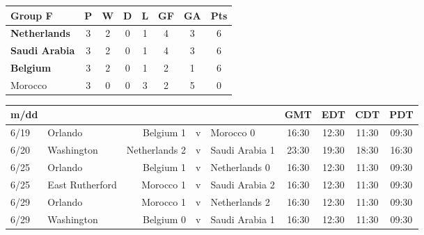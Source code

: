 \begin{figure}[H]

\begin{tabular}{l*{7}{c}}
Group F & P & W & D & L & GF & GA & Pts \\ \hline
\textbf{Netherlands} & 3 & 2 & 0 & 1 & 4 & 3 & 6 \\
\textbf{Saudi Arabia} &  3 & 2 & 0 & 1 & 4 & 3 & 6 \\
\textbf{Belgium}  & 3 & 2 & 0 & 1 & 2 & 1 & 6 \\
Morocco & 3 & 0 & 0 &  3 & 2 & 5 & 0 \\ \hline
\end{tabular}
\end{figure}
\begin{figure}[H]


\begin{tabular}{l l r c l c c c c}
m/dd  & & & & & GMT & EDT & CDT & PDT \\ \hline
6/19 & Orlando & Belgium 1 & v & Morocco 0 & 16:30 & 12:30 & 11:30 & 09:30 \\
6/20 & Washington & Netherlands 2 & v & Saudi Arabia 1 & 23:30 & 19:30 & 18:30 & 16:30 \\
6/25 & Orlando & Belgium 1 & v & Netherlands 0 & 16:30 & 12:30 & 11:30 & 09:30 \\
6/25 & East Rutherford & Morocco 1 & v & Saudi Arabia 2 &16:30 & 12:30 & 11:30 & 09:30 \\
6/29 & Orlando & Morocco 1 & v & Netherlands 2 & 16:30 & 12:30 & 11:30 & 09:30 \\
6/29 & Washington & Belgium 0 & v & Saudi Arabia 1 & 16:30 & 12:30 & 11:30 & 09:30 \\ \hline
\end{tabular}
\end{figure}

